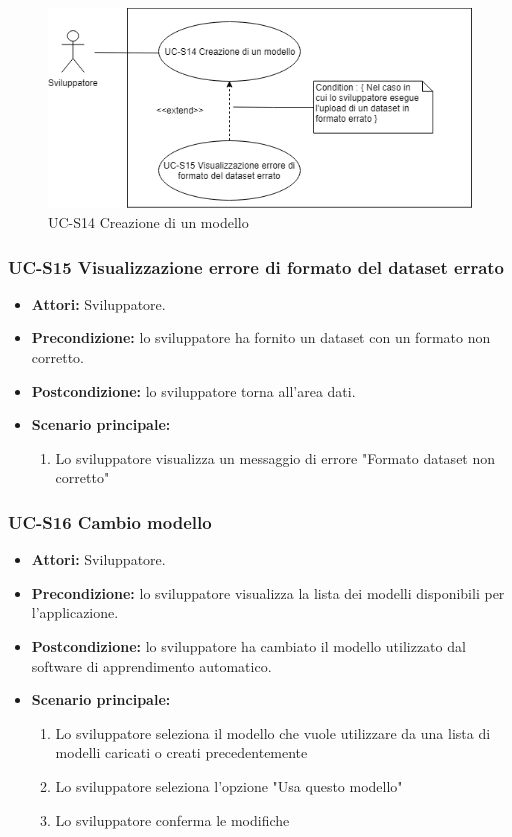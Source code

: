 		\begin{figure}[h]
			\centering
			\includegraphics[scale=0.7]{images/UC-S14.png}
				\caption{UC-S14 Creazione di un modello}
		\end{figure}	
	
	\subsubsection{UC-S15 Visualizzazione errore di formato del dataset errato}	
	\begin{itemize}					
			\item \textbf{Attori:} Sviluppatore.
			\item \textbf{Precondizione:} lo sviluppatore ha fornito un dataset con un formato non corretto.
			\item \textbf{Postcondizione:} lo sviluppatore torna all'area dati.
			\item \textbf{Scenario principale:}
				\begin{enumerate}
					\item Lo sviluppatore visualizza un messaggio di errore "Formato dataset non corretto"
				\end{enumerate}	
		\end{itemize}		
	
	\subsubsection{UC-S16 Cambio modello}
	\begin{itemize}					
			\item \textbf{Attori:} Sviluppatore.
			\item \textbf{Precondizione:} lo sviluppatore visualizza la lista dei modelli disponibili per l'applicazione.
			\item \textbf{Postcondizione:} lo sviluppatore ha cambiato il modello utilizzato dal software di apprendimento automatico.
			\item \textbf{Scenario principale:}
				\begin{enumerate}
					\item Lo sviluppatore seleziona il modello che vuole utilizzare da una lista di modelli caricati o creati precedentemente
					\item Lo sviluppatore seleziona l'opzione "Usa questo modello"
					\item Lo sviluppatore conferma le modifiche
				\end{enumerate}	
		\end{itemize}		
	
